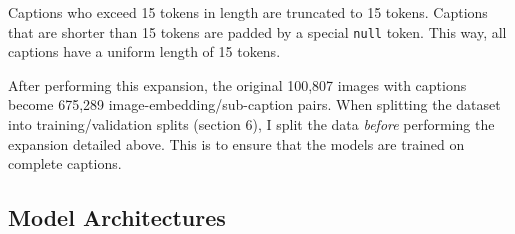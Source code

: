 \documentclass[letterpaper, 10 pt, conference]{ieeeconf}
\begin{document}
Captions who exceed 15 tokens in length are truncated to 15 tokens. Captions that are shorter than 15 tokens are padded by a special \texttt{null} token. This way, all captions have a uniform length of 15 tokens.

After performing this expansion, the original 100,807 images with captions become 675,289 image-embedding/sub-caption pairs. When splitting the dataset into training/validation splits (section 6), I split the data \textit{before} performing the expansion detailed above. This is to ensure that the models are trained on complete captions.

\subsection{Model Architectures}
\end{document}
